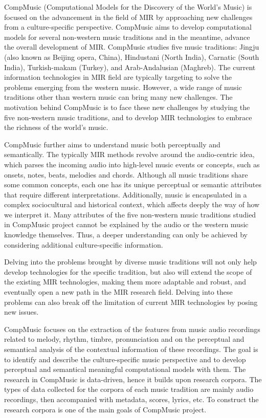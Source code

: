 CompMusic (Computational Models for the Discovery of the World's Music) is focused on the advancement in the field of \gls{MIR} by approaching new challenges from a culture-specific perspective. CompMusic aims to develop computational models for several non-western music traditions and in the meantime, advance the overall development of \gls{MIR}. CompMusic studies five music traditions: Jingju (also known as Beijing opera, China), Hindustani (North India), Carnatic (South India), Turkish-makam (Turkey), and Arab-Andalusian (Maghreb).  The current information technologies in \gls{MIR} field are typically targeting to solve the problems emerging from the western music. However, a wide range of music traditions other than western music can bring many new challenges. The motivation behind CompMusic is to face these new challenges by studying the five non-western music traditions, and to develop \gls{MIR} technologies to embrace the richness of the world's music.

CompMusic further aims to understand music both perceptually and semantically. The typically \gls{MIR} methods revolve around the audio-centric idea, which parses the incoming audio into high-level music events or concepts, such as onsets, notes, beats, melodies and chords. Although all music traditions share some common concepts, each one has its unique perceptual or semantic attributes that require different interpretations. Additionally, music is encapsulated in a complex sociocultural and historical context, which affects deeply the way of how we interpret it. Many attributes of the five non-western music traditions studied in CompMusic project cannot be explained by the audio or the western music knowledge themselves. Thus, a deeper understanding can only be achieved by considering additional culture-specific information.

Delving into the problems brought by diverse music traditions will not only help develop technologies for the specific tradition, but also will extend the scope of the existing \gls{MIR} technologies, making them more adaptable and robust, and eventually open a new path in the \gls{MIR} research field. Delving into these problems can also break off the limitation of current \gls{MIR} technologies by posing new issues. 

CompMusic focuses on the extraction of the features from music audio recordings related to melody, rhythm, timbre, pronunciation and on the perceptual and semantical analysis of the contextual information of these recordings. The goal is to identify and describe the culture-specific music perspective and to develop perceptual and semantical meaningful computational models with them. The research in CompMusic is data-driven, hence it builds upon research corpora. The types of data collected for the corpora of each music tradition are mainly audio recordings, then accompanied with metadata, scores, lyrics, etc. To construct the research corpora is one of the main goals of CompMusic project.

